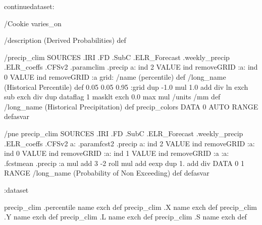 \begin{ingrid}

continuedataset:


/Cookie varies_on

/description (Derived Probabilities) def

/precip_clim {
SOURCES .IRI .FD .SubC .ELR_Forecast .weekly_precip .ELR_coeffs .CFSv2
  .paramclim .precip
   a:
     ind 2 VALUE
     ind removeGRID
     :a:
      ind 0 VALUE
      ind removeGRID
      :a
    grid:
      /name (percentile) def
      /long_name (Historical Percentile) def
      0.05 0.05 0.95 :grid
     dup
      -1.0 mul
      1.0 add
      div
     ln exch sub
    exch div
   dup dataflag
    1 masklt
    exch
    0.0 max
    mul
/units /mm def
/long_name (Historical Precipitation) def
precip_colors
DATA 0 AUTO RANGE
}defasvar

/pne{
precip_clim
SOURCES .IRI .FD .SubC .ELR_Forecast .weekly_precip .ELR_coeffs .CFSv2
   a: .paramfcst2 .precip
    a:
      ind 2 VALUE
      ind removeGRID
      :a:
       ind 0 VALUE
       ind removeGRID
       :a:
        ind 1 VALUE
        ind removeGRID
        :a
      :a: .fcstmean .precip :a mul
      add
     3 -2 roll
     mul
    add
   eexp
   dup
    1. add
    div
   DATA 0 1 RANGE
  /long_name (Probability of Non Exceeding) def
}defasvar

:dataset

precip_clim .percentile name exch def
precip_clim .X name exch def
precip_clim .Y name exch def
precip_clim .L name exch def
precip_clim .S name exch def

\end{ingrid}

